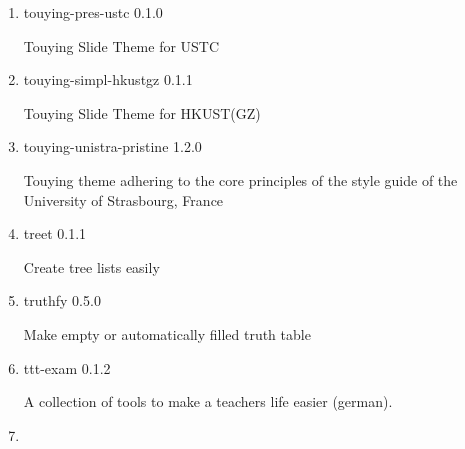 \begin{enumerate}
  { touying-flow } { 1.0.0 }

  Discard irrelevant decorative elements, aiming to better immerse the
  audience into a state of flow.
\item
  \href{/universe/package/touying-pres-ustc/}{}


  { touying-pres-ustc } { 0.1.0 }

  Touying Slide Theme for USTC
\item
  \href{/universe/package/touying-simpl-hkustgz/}{}


  { touying-simpl-hkustgz } { 0.1.1 }

  Touying Slide Theme for HKUST(GZ)
\item
  \href{/universe/package/touying-unistra-pristine/}{}


  { touying-unistra-pristine } { 1.2.0 }

  Touying theme adhering to the core principles of the style guide of
  the University of Strasbourg, France
\item
  \href{/universe/package/treet/}{}

  { treet } { 0.1.1 }

  Create tree lists easily
\item
  \href{/universe/package/truthfy/}{}

  { truthfy } { 0.5.0 }

  Make empty or automatically filled truth table
\item
  \href{/universe/package/ttt-exam/}{}


  { ttt-exam } { 0.1.2 }

  A collection of tools to make a teachers life easier (german).
\item
  \href{/universe/package/ttt-lists/}{}



\end{enumerate}
